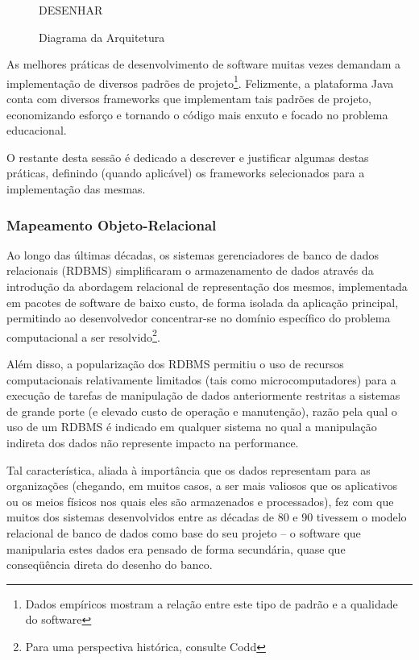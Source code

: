 \documentclass{abnt}
\begin{document}
\begin{figure}[htbp]
\begin{center}
DESENHAR
\caption{Diagrama da Arquitetura}
\label{default}
\end{center}
\end{figure}


As melhores práticas de desenvolvimento de software muitas vezes demandam a implementação de diversos padrões de projeto\footnote{Dados empíricos mostram\cite{IeeeExperience} a relação entre este tipo de padrão e a qualidade do software}. Felizmente, a plataforma Java conta com diversos frameworks que implementam tais padrões de projeto, economizando esforço e tornando o código mais enxuto e focado no problema educacional.

O restante desta sessão é dedicado a descrever e justificar algumas destas práticas, definindo (quando aplicável) os frameworks selecionados para a implementação das mesmas.

\subsubsection{Mapeamento Objeto-Relacional}

Ao longo das últimas décadas, os sistemas gerenciadores de banco de dados relacionais (RDBMS)  simplificaram o armazenamento de dados através da introdução da abordagem relacional de representação dos mesmos, implementada em pacotes de software de baixo custo, de forma isolada da aplicação principal, permitindo ao desenvolvedor concentrar-se no domínio específico do problema computacional a ser resolvido\footnote{Para uma perspectiva histórica, consulte Codd\cite{Codd1970}}.

Além disso, a popularização dos RDBMS permitiu o uso de recursos computacionais relativamente limitados (tais como microcomputadores) para a execução de tarefas de manipulação de dados anteriormente restritas a sistemas de grande porte (e elevado custo de operação e manutenção), razão pela qual o uso de um RDBMS é indicado em qualquer sistema no qual a manipulação indireta dos dados não represente impacto na performance.

Tal característica, aliada à importância que os dados representam para as organizações (chegando, em muitos casos, a ser mais valiosos que os aplicativos ou os meios físicos nos quais eles são armazenados e processados), fez com que muitos dos sistemas desenvolvidos entre as décadas de 80 e 90 tivessem o modelo relacional de banco de dados como base do seu projeto – o software que manipularia estes dados era pensado de forma secundária, quase que conseqüência direta do desenho do banco.
\end{document}
